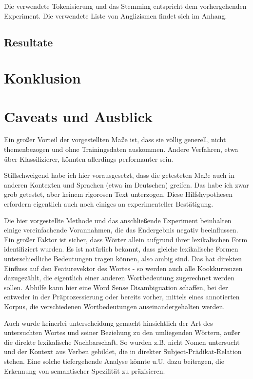 \documentclass[11pt,numbers=noenddot]{scrartcl}
\begin{document}
Die verwendete Tokenisierung und das Stemming entspricht dem vorhergehenden Experiment. Die verwendete Liste von Anglizismen findet sich im Anhang.

\subsection{Resultate}

\section{Konklusion}

\section{Caveats und Ausblick} \label{ausblick}

Ein großer Vorteil der vorgestellten Maße ist, dass sie völlig generell, nicht themenbezogen und ohne Trainingsdaten auskommen. Andere Verfahren, etwa über Klassifizierer, könnten allerdings performanter sein.

Stillschweigend habe ich hier vorausgesetzt, dass die getesteten Maße auch in anderen Kontexten und Sprachen (etwa im Deutschen) greifen. Das habe ich zwar grob getestet, aber keinem rigorosen Text unterzogen. Diese Hilfshypothesen erfordern eigentlich auch noch einiges an experimenteller Bestätigung.

Die hier vorgestellte Methode und das anschließende Experiment beinhalten einige vereinfachende Vorannahmen, die das Endergebnis negativ beeinflussen. Ein großer Faktor ist sicher, dass Wörter allein aufgrund ihrer lexikalischen Form identifiziert wurden. Es ist natürlich bekannt, dass gleiche lexikalische Formen unterschiedliche Bedeutungen tragen können, also ambig sind. Das hat direkten Einfluss auf den Featurevektor des Wortes - so werden auch alle Kookkurrenzen dazugezählt, die eigentlich einer anderen Wortbedeutung zugerechnet werden sollen. Abhilfe kann hier eine Word Sense Disambiguation schaffen, bei der entweder in der Präprozessierung oder bereits vorher, mittels eines annotierten Korpus, die verschiedenen Wortbedeutungen auseinandergehalten werden.

Auch wurde keinerlei unterscheidung gemacht hinsichtlich der Art des untersuchten Wortes und seiner Beziehung zu den umliegenden Wörtern, außer die direkte lexikalische Nachbarschaft. So wurden z.B. nicht Nomen untersucht und der Kontext aus Verben gebildet, die in direkter Subject-Prädikat-Relation stehen. Eine solche tiefergehende Analyse könnte u.U. dazu beitragen, die Erkennung von semantischer Spezifität zu präzisieren.
\end{document}
